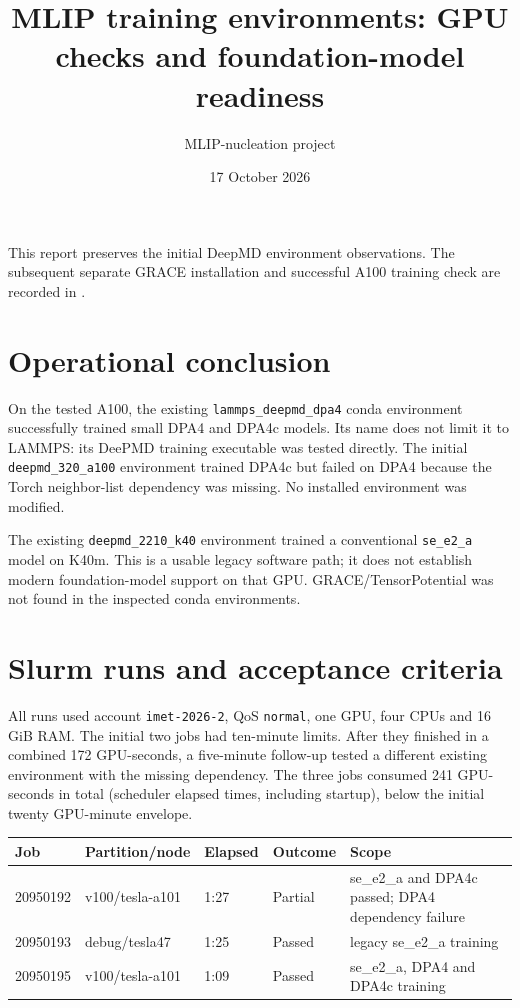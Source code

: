 \documentclass[10pt,a4paper]{article}
\title{MLIP training environments: GPU checks and foundation-model readiness}
\author{MLIP-nucleation project}
\date{17 October 2026}
\begin{document}
\maketitle

This report preserves the initial DeepMD environment observations. The subsequent
separate GRACE installation and successful A100 training check are recorded in
.

\section{Operational conclusion}
On the tested A100, the existing \texttt{lammps\_deepmd\_dpa4} conda environment
successfully trained small DPA4 and DPA4c models. Its name does not limit it to
LAMMPS: its DeePMD training executable was tested directly. The initial
\texttt{deepmd\_320\_a100} environment trained DPA4c but failed on DPA4 because
the Torch neighbor-list dependency was missing. No installed environment was modified.

The existing \texttt{deepmd\_2210\_k40} environment trained a conventional
\texttt{se\_e2\_a} model on K40m. This is a usable legacy software path;
it does not establish modern foundation-model support on that GPU.
GRACE/TensorPotential was not found in the inspected conda environments.

\section{Slurm runs and acceptance criteria}
All runs used account \texttt{imet-2026-2}, QoS \texttt{normal}, one GPU,
four CPUs and 16 GiB RAM. The initial two jobs had ten-minute limits.
After they finished in a combined 172 GPU-seconds, a five-minute follow-up
tested a different existing environment with the missing dependency.
The three jobs consumed 241 GPU-seconds in total (scheduler elapsed times,
including startup), below the initial twenty GPU-minute envelope.

\begin{center}
\begin{tabularx}{\linewidth}{@{}llllX@{}}
\toprule
Job & Partition/node & Elapsed & Outcome & Scope \\
\midrule
20950192 & v100/tesla-a101 & 1:27 & Partial & se\_e2\_a and DPA4c passed; DPA4 dependency failure \\
20950193 & debug/tesla47 & 1:25 & Passed & legacy se\_e2\_a training \\
20950195 & v100/tesla-a101 & 1:09 & Passed & se\_e2\_a, DPA4 and DPA4c training \\
\bottomrule
\end{tabularx}
\end{center}
\end{document}
